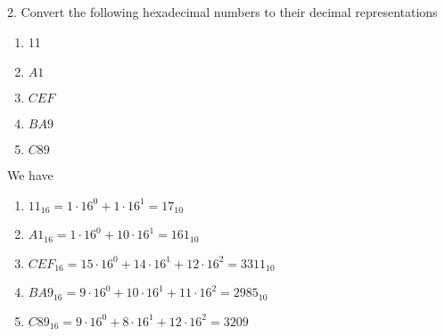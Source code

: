 \documentclass{report}
\begin{document}
    \bigbreak \noindent 
    \begin{mdframed}
        2. Convert the following hexadecimal numbers to their decimal representations
        \begin{enumerate}[label=\alph*.]
            \item 11 
            \item $A1$
            \item $CEF$
            \item $BA9$
            \item $C89$
        \end{enumerate}
    \end{mdframed}
    \bigbreak \noindent 
    We have
    \begin{enumerate}[label=(\alph*)]
        \item $11_{16} = 1 \cdot 16^{0} + 1 \cdot 16^{1} = 17_{10} $
        \item $A1_{16} = 1 \cdot 16^{0} + 10 \cdot 16^{1}= 161_{10} $
        \item $CEF_{16} = 15 \cdot 16^{0} + 14 \cdot 16^{1} + 12 \cdot 16^{2} = 3311_{10} $
        \item $BA9_{16} = 9 \cdot 16^{0} + 10 \cdot 16^{1} + 11 \cdot 16^{2} = 2985_{10} $
        \item $C89_{16} = 9 \cdot 16^{0} + 8 \cdot 16^{1} + 12 \cdot 16^{2} = 3209 $
    \end{enumerate}
\end{document}
